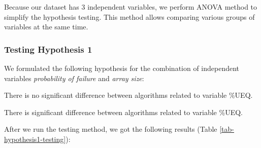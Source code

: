  Because our dataset has 3 independent variables, we perform ANOVA method to simplify the hypothesis testing. This method allows comparing various groups of variables at the same time.

 \subsubsection{Testing Hypothesis 1}

We formulated the following hypothesis for the combination of independent variables \textit{probability of failure} and \textit{array size}:

\setcounter{hyp}{-1}
\begin{hyp} \label{hyp:a} There is no significant difference between algorithms related to variable \%UEQ.\end{hyp}
\begin{hyp} \label{hyp:b} There is significant difference between algorithms related to variable \%UEQ.\end{hyp}

After we run the testing method, we got the following results (Table \ref{tab-hypothesis1-testing}):

